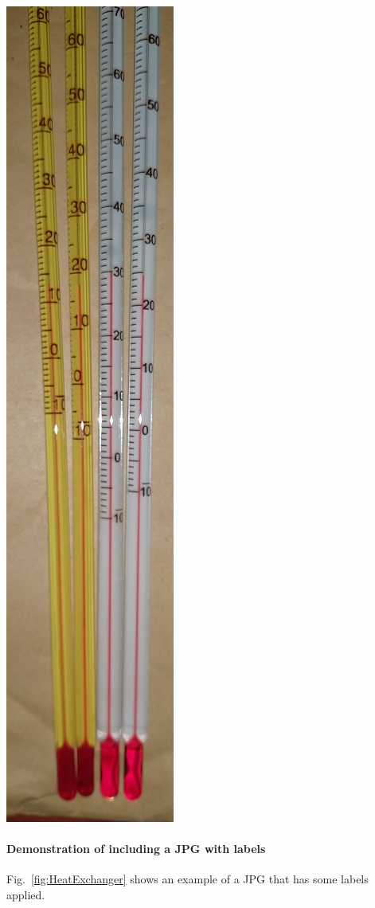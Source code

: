 \begin{center}%
\begin{minipage}{\columnwidth}%
	\centering
	\includegraphics[height=1\textwidth, angle=90]{600-Appendices/Examples/Thermometer.jpg}
	\label{fig:thermometer}	
\end{minipage}
\end{center}


\paragraph{Demonstration of including a JPG with labels}
Fig.~\ref{fig:HeatExchanger} shows an example of a JPG that has some labels applied.

